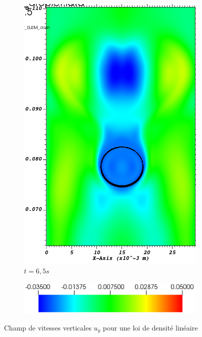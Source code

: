 \begin{figure}[H]
\begin{subfigure}[ht!]{0.23\textwidth}
		\includegraphics[width=1\textwidth]{fig_plateau_vitesse/visit0019.png}
		\caption{$t=6,5s$}
		\label{fig:three sin x}
	\end{subfigure}
	\begin{subfigure}[ht!]{0.4\textwidth}
	\centering
	\includegraphics[width=1\textwidth]{fig_plateau_vitesse/colorbar1.png}

\end{subfigure}
	\caption{Champ de vitesses verticales $u_y$ pour une loi de densité linéaire}
	\label{fig:rencotresillage}
\end{figure}

